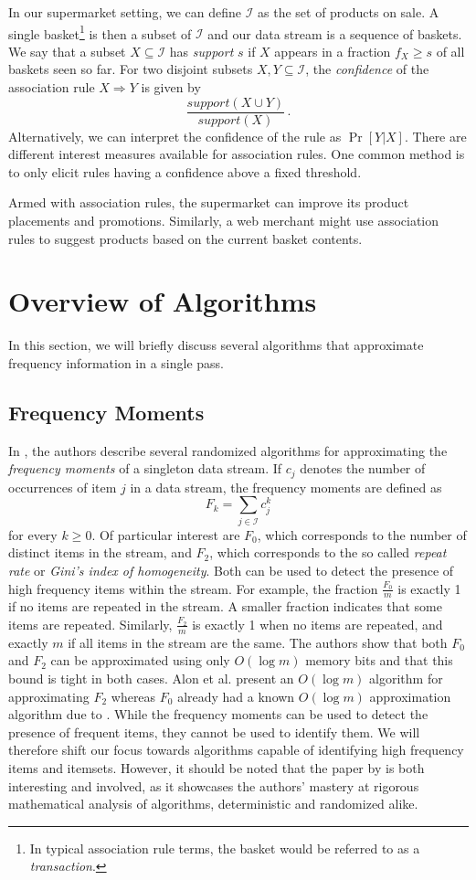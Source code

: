 \documentclass[a4paper]{article}
\begin{document}
In our supermarket setting, we can define $\mathcal{I}$ as the set of products on sale. A single basket\footnote{In typical association rule terms, the basket would be referred to as a \textit{transaction}.} is then a subset of $\mathcal{I}$ and our data stream is a sequence of baskets. We say that a subset $X \subseteq \mathcal{I}$ has \textit{support} $s$ if $X$ appears in a fraction $f_X \geq s$ of all baskets seen so far. For two disjoint subsets $X, Y \subseteq \mathcal{I}$, the \textit{confidence} of the association rule $X \Rightarrow Y$ is given by 
$$
\frac{support(X \cup Y)}{support(X)} \,.
$$
Alternatively, we can interpret the confidence of the rule as $\Pr[Y | X]$. There are different interest measures available for association rules. One common method is to only elicit rules having a confidence above a fixed threshold.

Armed with association rules, the supermarket can improve its product placements and promotions. Similarly, a web merchant might use association rules to suggest products based on the current basket contents.

\section{Overview of Algorithms}
In this section, we will briefly discuss several algorithms that approximate frequency information in a single pass.

\subsection{Frequency Moments}
In \citep{Alon1999137}, the authors describe several randomized algorithms for approximating the \textit{frequency moments} of a singleton data stream. If $c_j$ denotes the number of occurrences of item $j %
$ in a data stream, the frequency moments are defined as
$$
F_k = \sum_{j \in \mathcal{I}} c_j^k
$$
for every $k \geq 0$. Of particular interest are $F_0$, which corresponds to the number of distinct items in the stream, and $F_2$, which corresponds to the so called \textit{repeat rate} or \textit{Gini's index of homogeneity}. Both can be used to detect the presence of high frequency items within the stream. For example, the fraction $\frac{F_0}{m}$ is exactly 1 if no items are repeated in the stream. A smaller fraction indicates that some items are repeated. Similarly, $\frac{F_2}{m}$ is exactly 1 when no items are repeated, and exactly $m$ if all items in the stream are the same. The authors show that both $F_0$ and $F_2$ can be approximated using only $O(\log m)$ memory bits and that this bound is tight in both cases. Alon et al. present an $O(\log m)$ algorithm for approximating $F_2$ whereas $F_0$ already had a known $O(\log m)$ approximation algorithm due to \cite{4568063}. While the frequency moments can be used to detect the presence of frequent items, they cannot be used to identify them. We will therefore shift our focus towards algorithms capable of identifying high frequency items and itemsets. However, it should be noted that the paper by \cite{Alon1999137} is both interesting and involved, as it showcases the authors' mastery at rigorous mathematical analysis of algorithms, deterministic and randomized alike.
\end{document}

